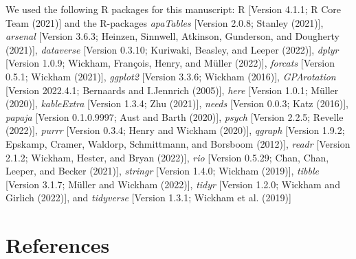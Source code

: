 \documentclass[
  english,
  man]{apa6}
\begin{document}
We used the following R packages for this manuscript: R {[}Version 4.1.1; R Core Team (2021){]} and the R-packages \emph{apaTables} {[}Version 2.0.8; Stanley (2021){]}, \emph{arsenal} {[}Version 3.6.3; Heinzen, Sinnwell, Atkinson, Gunderson, and Dougherty (2021){]}, \emph{dataverse} {[}Version 0.3.10; Kuriwaki, Beasley, and Leeper (2022){]}, \emph{dplyr} {[}Version 1.0.9; Wickham, François, Henry, and Müller (2022){]}, \emph{forcats} {[}Version 0.5.1; Wickham (2021){]}, \emph{ggplot2} {[}Version 3.3.6; Wickham (2016){]}, \emph{GPArotation} {[}Version 2022.4.1; Bernaards and I.Jennrich (2005){]}, \emph{here} {[}Version 1.0.1; Müller (2020){]}, \emph{kableExtra} {[}Version 1.3.4; Zhu (2021){]}, \emph{needs} {[}Version 0.0.3; Katz (2016){]}, \emph{papaja} {[}Version 0.1.0.9997; Aust and Barth (2020){]}, \emph{psych} {[}Version 2.2.5; Revelle (2022){]}, \emph{purrr} {[}Version 0.3.4; Henry and Wickham (2020){]}, \emph{qgraph} {[}Version 1.9.2; Epskamp, Cramer, Waldorp, Schmittmann, and Borsboom (2012){]}, \emph{readr} {[}Version 2.1.2; Wickham, Hester, and Bryan (2022){]}, \emph{rio} {[}Version 0.5.29; Chan, Chan, Leeper, and Becker (2021){]}, \emph{stringr} {[}Version 1.4.0; Wickham (2019){]}, \emph{tibble} {[}Version 3.1.7; Müller and Wickham (2022){]}, \emph{tidyr} {[}Version 1.2.0; Wickham and Girlich (2022){]}, and \emph{tidyverse} {[}Version 1.3.1; Wickham et al. (2019){]}

\newpage

\hypertarget{references}{%
\section{References}\label{references}}

\begingroup
\setlength{\parindent}{-0.5in}
\setlength{\leftskip}{0.5in}
\end{document}
